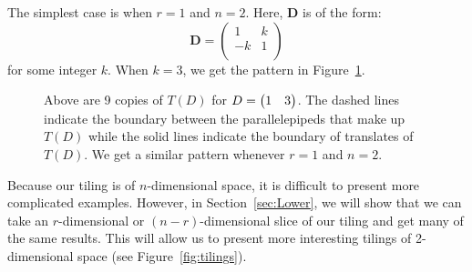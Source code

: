 \documentclass[ALCO,ThmDefs,Unicode,epreuves]{cedram}
\newcommand{\D}{\mathbf{D}}
\begin{document}
\begin{exam}\label{ex:2dim}
The simplest case is when $r=1$ and $n=2$. Here, $\D$ is of the form:
\[
 \D = \begin{pmatrix}
1 & k \\
-k & 1 \\
\end{pmatrix}
\]
for some integer $k$. When $k = 3$, we get the pattern in Figure~\ref{fig:tiling}.

\begin{figure}
\begin{center}
\caption{Above are 9 copies of $T(D)$ for $D = \protect\begin{pmatrix} 1 & 3 \protect\end{pmatrix}$. 
The dashed lines indicate the boundary between the parallelepipeds that make up $T(D)$ while the solid lines indicate the boundary of translates of $T(D)$. We get a similar pattern whenever $r=1$ and $n=2$.}
\label{fig:tiling}
\end{center}
\end{figure}
\end{exam}

\begin{rema}
Because our tiling is of $n$-dimensional space, it is difficult to present more complicated examples. However, in Section~\ref{sec:Lower}, we will show that we can take an $r$-dimensional or $(n-r)$-dimensional slice of our tiling and get many of the same results. This will allow us to present more interesting tilings of 2-dimensional space (see Figure~\ref{fig:tilings}). 
\end{rema}
\end{document}
